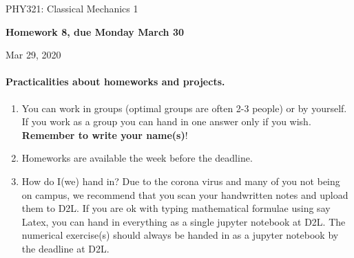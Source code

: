 \documentclass[%
oneside,                 %
final,                   %
10pt]{article}
\begin{document}

\newcommand{\exercisesection}[1]{\subsection*{#1}}






\thispagestyle{empty}

\begin{center}
{\LARGE\bf
\begin{spacing}{1.25}
PHY321: Classical Mechanics 1
\end{spacing}
}
\end{center}


\begin{center}
{\bf Homework 8, due Monday  March 30${}^{}$} \\ [0mm]
\end{center}

\begin{center}
\end{center}
    

\begin{center}
Mar 29, 2020
\end{center}

\vspace{1cm}


\paragraph{Practicalities about  homeworks and projects.}
\begin{enumerate}
\item You can work in groups (optimal groups are often 2-3 people) or by yourself. If you work as a group you can hand in one answer only if you wish. \textbf{Remember to write your name(s)}!

\item Homeworks are available  the week before the deadline. 

\item How do I(we)  hand in?  Due to the corona virus and many of you not being on campus, we recommend that you scan your handwritten notes and upload them to D2L. If you are ok with typing mathematical formulae using say Latex, you can hand in everything as a single jupyter notebook at D2L. The numerical exercise(s) should always be handed in as a jupyter notebook by the deadline at D2L. 
\end{enumerate}
\end{document}
